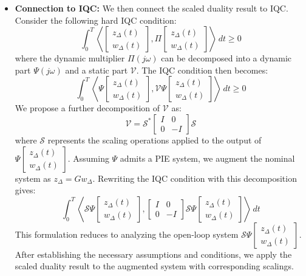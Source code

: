 \begin{itemize}
	\item \textbf{Connection to IQC:} We then connect the scaled duality result to IQC. Consider the following hard IQC condition:
	      \[
		      \int_0^T \left\langle \begin{bmatrix} z_\Delta(t) \\ w_\Delta(t) \end{bmatrix}, \Pi \begin{bmatrix} z_\Delta(t) \\ w_\Delta(t) \end{bmatrix} \right\rangle \, dt \geq 0
	      \]
	      where the dynamic multiplier \( \Pi(j\omega) \) can be decomposed into a dynamic part \( \Psi(j\omega) \) and a static part \( \mathcal{V} \). The IQC condition then becomes:
	      \[
		      \int_0^T \left\langle \Psi \begin{bmatrix} z_\Delta(t) \\ w_\Delta(t) \end{bmatrix}, \mathcal{V} \Psi \begin{bmatrix} z_\Delta(t) \\ w_\Delta(t) \end{bmatrix} \right\rangle \, dt \geq 0
	      \]
	      We propose a further decomposition of \( \mathcal{V} \) as:
	      \[
		      \mathcal{V} = \mathcal{S}^* \begin{bmatrix} I & 0 \\ 0 & -I \end{bmatrix} \mathcal{S}
	      \]
	      where \( \mathcal{S} \) represents the scaling operations applied to the output of \( \Psi \begin{bmatrix} z_\Delta(t) \\ w_\Delta(t) \end{bmatrix} \). Assuming \( \Psi \) admits a PIE system, we augment the nominal system as \( z_\Delta = G w_\Delta \). Rewriting the IQC condition with this decomposition gives:
	      \[
		      \int_0^T \left\langle \mathcal{S} \Psi \begin{bmatrix} z_\Delta(t) \\ w_\Delta(t) \end{bmatrix}, \begin{bmatrix} I & 0 \\ 0 & -I \end{bmatrix} \mathcal{S} \Psi \begin{bmatrix} z_\Delta(t) \\ w_\Delta(t) \end{bmatrix} \right\rangle \, dt
	      \]
	      This formulation reduces to analyzing the open-loop system \( \mathcal{S} \Psi \begin{bmatrix} z_\Delta(t) \\ w_\Delta(t) \end{bmatrix} \). After establishing the necessary assumptions and conditions, we apply the scaled duality result to the augmented system with corresponding scalings.


\end{itemize}
